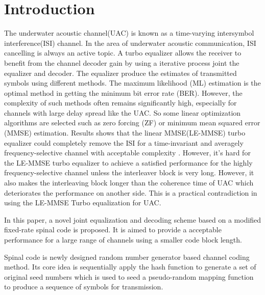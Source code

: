 \documentclass[conference]{IEEEtran}
\begin{document}
\section{Introduction}
The underwater acoustic channel(UAC) is known as a time-varying intersymbol interference(ISI) channel. In the area of underwater acoustic communication, ISI cancelling is always an active topic. A turbo equalizer\cite{douillard1995iterative}
allows the receiver to benefit from the channel decoder gain by using a iterative process joint the equalizer and decoder. The equalizer produce the estimates of transmitted symbols using different methods. The maximum likelihood (ML) estimation is the optimal method in getting the minimum bit error rate (BER). However, the complexity of such methods often remains significantly high, especially for channels with large delay spread like the UAC. So some linear optimization algorithms are selected such as zero forcing (ZF) or minimum mean squared error (MMSE) estimation.   
Results shows that the linear MMSE(LE-MMSE) turbo equalizer could completely remove the ISI for a time-invariant and averagely frequency-selective channel with acceptable complexity \cite{laot2001turbo}. However, it's hard for the LE-MMSE  turbo equalizer to achieve a satisfied performance for the highly frequency-selective channel unless the interleaver block  is very long. However, it also makes the interleaving block longer than the coherence  time of UAC which deteriorates the performance on another side. This is a practical contradiction in using the LE-MMSE Turbo equalization for UAC.


In this paper, a novel joint equalization and decoding scheme based on a modified fixed-rate spinal code is proposed. It is aimed to provide a acceptable performance for a large range of channels using a smaller code block length.  

Spinal code is newly designed \cite{perry2012spinal}
random number generator based channel coding method. Its core idea is sequentially apply the hash function to generate a set of original seed numbers which is used to seed a pseudo-random mapping function to produce a sequence of symbols for transmission. 
\end{document}

